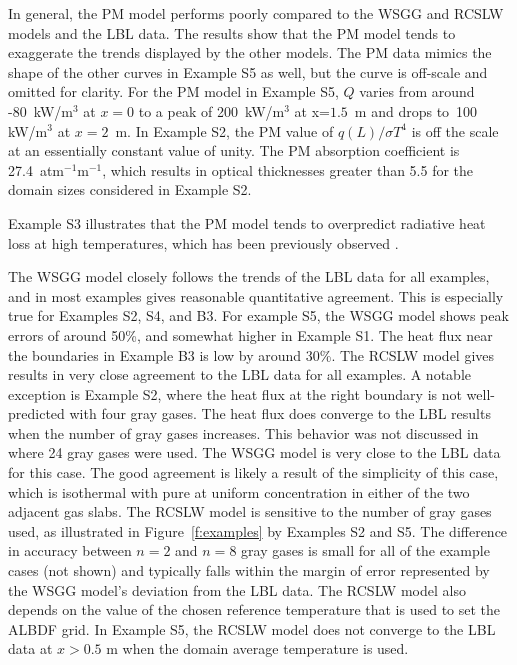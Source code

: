 \documentclass[preprint,12pt]{elsarticle}
\begin{document}
In general, the PM model performs poorly compared to the WSGG and RCSLW models and the LBL data. The results show that the PM model tends to exaggerate the trends displayed by the other models. The PM data mimics the shape of the other curves in Example S5 as well, but the curve is off-scale and omitted for clarity. For the PM model in Example S5, $Q$ varies from around -80~kW/m$^3$ at $x=0$ to a peak of 200~kW/m$^3$ at x=$1.5$~m and drops to~100 kW/m$^3$ at $x=2$~m.  In Example S2, the PM value of $q(L)/\sigma T^4$ is off the scale at an essentially constant value of unity. 
%
The PM absorption coefficient is 27.4~atm$^{-1}$m$^{-1}$, which results in optical thicknesses greater than 5.5
for the domain sizes considered in Example S2.
%

Example S3 illustrates that the PM model tends to overpredict radiative heat loss at high temperatures, which has been previously observed \cite{Frank_2000,Zhu_2002,Coelho_2002}.

The WSGG model closely follows the trends of the LBL data for all examples, and in most examples gives reasonable quantitative agreement. This is especially true for Examples S2, S4, and B3. For example S5, the WSGG model shows peak errors of around 50\%, and somewhat higher in Example S1. The heat flux near the boundaries in Example B3 is low by around 30\%. The RCSLW model gives results in very close agreement to the LBL data for all examples. A notable exception is Example S2, where the heat flux at the right boundary is not well-predicted with four gray gases. The heat flux does converge to the LBL results when the number of gray gases increases. This behavior was not discussed in \cite{Solovjov_2017} where 24 gray gases were used. The WSGG model is very close to the LBL data for this case. The good agreement is likely a result of the simplicity of this case, which is isothermal with pure  at uniform concentration in either of the two adjacent gas slabs.  The RCSLW model is sensitive to the number of gray gases used, as illustrated in Figure~\ref{f:examples} by Examples S2 and S5. The difference in accuracy between $n=2$ and $n=8$ gray gases is small for all of the example cases (not shown) and typically falls within the margin of error represented by the WSGG model's deviation from the LBL data.
The RCSLW model also depends on the value of the chosen reference temperature that is used to set the ALBDF grid.  In Example S5, the RCSLW model does not converge to the LBL data at $x>0.5$ m when the domain average temperature is used.
\end{document}
